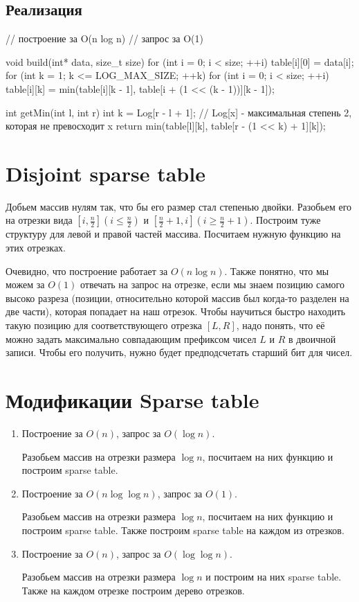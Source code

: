 \subsection{Реализация}
\begin{cppcode}
// построение за O(n log n)
// запрос за O(1)
	
void build(int* data, size_t size) {
	for (int i = 0; i < size; ++i)
		table[i][0] = data[i];
	for (int k = 1; k <= LOG_MAX_SIZE; ++k)
		for (int i = 0; i < size; ++i)
			table[i][k] = min(table[i][k - 1], table[i + (1 << (k - 1))][k - 1]);
}	
	
int getMin(int l, int r) {
	int k = Log[r - l + 1]; // Log[x] - максимальная степень 2, которая не превосходит x
	return min(table[l][k], table[r - (1 << k) + 1][k]);
}
\end{cppcode}

\section{Disjoint sparse table}
Добьем массив нулям так, что бы его размер стал степенью двойки.
Разобьем его на отрезки вида $[i, \frac{n}{2}] (i \le \frac{n}{2})$ и $[\frac{n}{2} + 1, i] (i \ge \frac{n}{2} + 1)$.
Построим туже структуру для левой и правой частей массива.
Посчитаем нужную функцию на этих отрезках.

Очевидно, что построение работает за $O(n \log n)$. Также понятно, что мы можем за $O(1)$ отвечать на запрос на отрезке, если мы знаем позицию
самого высоко разреза (позиции, относительно которой массив был когда-то разделен на две части), которая попадает на наш отрезок.
Чтобы научиться быстро находить такую позицию для соответствующего отрезка $[L, R]$, надо понять, что её можно задать
максимально совпадающим префиксом чисел $L$ и $R$ в двоичной записи.
Чтобы его получить, нужно будет предподсчетать старший бит для чисел.

\section{Модификации Sparse table}
\begin{enumerate}
	\item Построение за $O(n)$, запрос за $O(\log n)$.
	
	Разобьем массив на отрезки размера $\log n$, посчитаем на них функцию и построим sparse table.
	
	\item Построение за $O(n \log \log n)$, запрос за $O(1)$.
	
	Разобьем массив на отрезки размера $\log n$, посчитаем на них функцию и построим sparse table.
	Также построим sparse table на каждом из отрезков.
	 
	\item Построение за $O(n)$, запрос за $O(\log \log n)$.
	
	Разобьем массив на отрезки размера $\log n$ и построим на них sparse table.
	Также на каждом отрезке построим дерево отрезков.
	
\end{enumerate}


